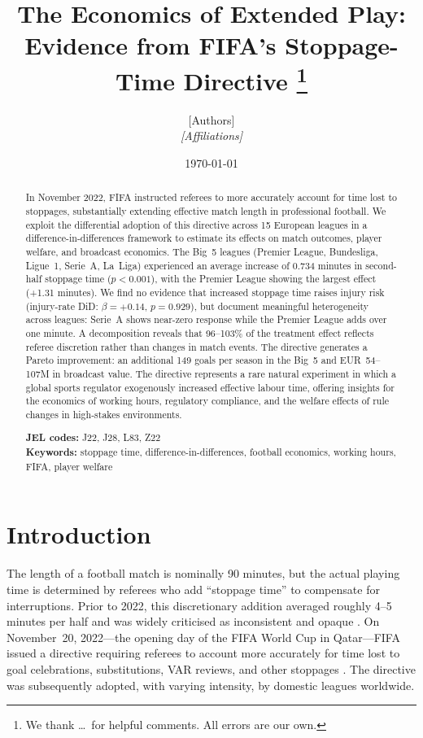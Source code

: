 \documentclass[12pt]{article}
\title{The Economics of Extended Play:\\
Evidence from FIFA's Stoppage-Time Directive%
\thanks{We thank \ldots\ for helpful comments. All errors are our own.}}
\author{[Authors]\\[4pt]\textit{[Affiliations]}}
\date{\today}
\begin{document}
\maketitle

\begin{abstract}
\noindent
In November 2022, FIFA instructed referees to more accurately account for
time lost to stoppages, substantially extending effective match length in
professional football. We exploit the differential adoption of this directive
across 15 European leagues in a difference-in-differences framework to
estimate its effects on match outcomes, player welfare, and broadcast
economics. The Big~5 leagues (Premier League, Bundesliga, Ligue~1,
Serie~A, La~Liga) experienced an average increase of 0.734 minutes in
second-half stoppage time ($p < 0.001$), with the Premier League showing
the largest effect (+1.31 minutes). We find no evidence that increased
stoppage time raises injury risk (injury-rate DiD: $\beta = +0.14$,
$p = 0.929$), but
document meaningful heterogeneity across leagues: Serie~A shows near-zero
response while the Premier League adds over one minute. A \citet{gelbach2016when}
decomposition reveals that 96--103\% of the treatment effect reflects
referee discretion rather than changes in match events. The directive
generates a Pareto improvement: an additional 149 goals per season in
the Big~5 and EUR~54--107M in broadcast value. The directive represents a rare natural experiment in
which a global sports regulator exogenously increased effective labour
time, offering insights for the economics of working hours, regulatory
compliance, and the welfare effects of rule changes in high-stakes
environments.

\medskip
\noindent\textbf{JEL codes:} J22, J28, L83, Z22\\
\noindent\textbf{Keywords:} stoppage time, difference-in-differences,
football economics, working hours, FIFA, player welfare
\end{abstract}

\newpage
\doublespacing

\section{Introduction}\label{sec:intro}

The length of a football match is nominally 90 minutes, but the actual
playing time is determined by referees who add ``stoppage time'' to
compensate for interruptions. Prior to 2022, this discretionary addition
averaged roughly 4--5 minutes per half and was widely criticised as
inconsistent and opaque \citep{garicano2005favoritism, dohmen2008professionals}.
On November~20, 2022---the opening day of the FIFA World Cup in
Qatar---FIFA issued a directive requiring referees to account more
accurately for time lost to goal celebrations, substitutions, VAR
reviews, and other stoppages \citep{wei2024goal}. The directive was
subsequently adopted, with varying intensity, by domestic leagues
worldwide.
\end{document}

